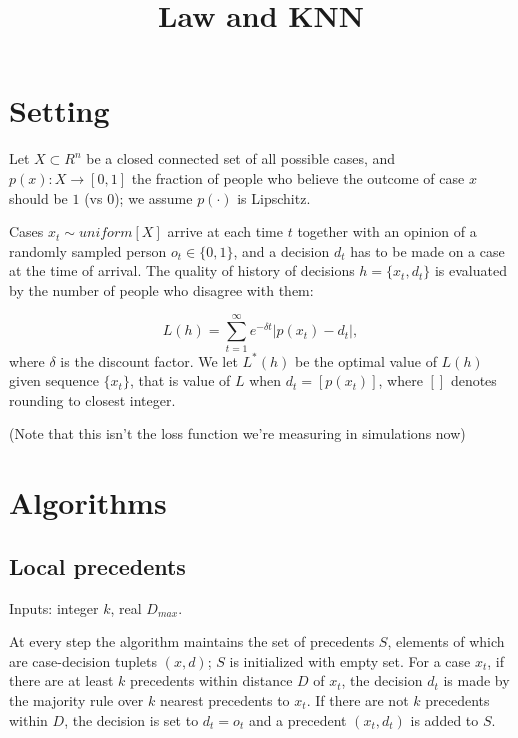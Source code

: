 \documentclass{article}
\begin{document}
\title{Law and KNN}
\date{\vspace{-5ex}}
\maketitle



\section{Setting}

Let $X\subset R^n$ be a closed connected set of all possible cases, and $p(x): X\rightarrow [0,1]$ the fraction of people who believe the outcome of case $x$ should be $1$ (vs $0$); we assume $p(\cdot)$ is Lipschitz.

Cases $x_t\sim uniform[X]$ arrive at each time $t$ together with an opinion of a randomly sampled person $o_t\in \{0,1\}$, and a decision $d_t$ has to be made on a case at the time of arrival.  The quality of history of decisions $h = \{x_t,d_t\}$ is evaluated by the number of people who disagree with them:

$$L(h) = \sum_{t=1}^\infty e^{-\delta t}|p(x_t) -d_t|,$$
where $\delta$ is the discount factor. We let $L^*(h)$ be the optimal value of $L(h)$ given sequence $\{x_t\}$, that is value of $L$ when $d_t = [p(x_t)]$, where $[]$ denotes rounding to closest integer.

(Note that this isn't the loss function we're measuring in simulations now)

\section{Algorithms}

\subsection{Local precedents}

Inputs: integer $k$, real $D_{max}$.

At every step the algorithm maintains the set of precedents $S$, elements of which are case-decision tuplets $(x,d)$; $S$ is initialized with empty set. For a case $x_t$, if there are at least $k$ precedents within distance $D$ of $x_t$, the decision $d_t$ is made by the majority rule over $k$ nearest precedents to $x_t$. If there are not $k$ precedents within $D$, the decision is set to $d_t = o_t$ and a precedent $(x_t,d_t)$ is added to $S$.
\end{document}
